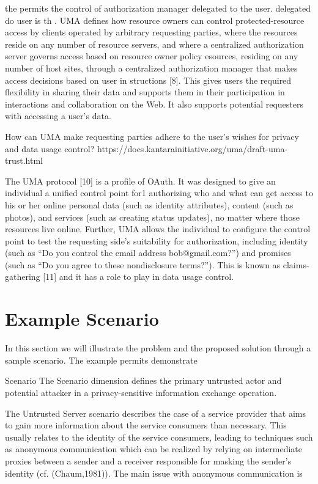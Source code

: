   the   permits the control of authorization manager delegated to the user.  delegated do user is th
  . UMA defines how resource owners can control protected-resource access by clients operated by arbitrary requesting parties, where the resources reside on any number of resource servers, and where a centralized authorization server governs access based on resource owner policy 
  esources,  residing  on  any  number  of  host  sites,  
  through  a  centralized  authorization  manager  that  makes  
  access decisions based on user in
  structions [8]. This gives 
  users  the  required  flexibility  in  sharing  their  data  and  
  supports  them  in  their  participation  in  interactions  and  
  collaboration   on   the   Web.   It   also   supports   potential   
  requesters with accessing a user’s data.
  
  How can UMA make requesting parties adhere to the user's wishes for privacy and data usage control?
  https://docs.kantarainitiative.org/uma/draft-uma-trust.html
  
  The UMA protocol [10] is a profile of OAuth. It was designed to give an individual a unified control point for1 authorizing who and what can get access to his or her online personal data (such as identity attributes), content (such as photos), and services (such as creating status updates), no matter where those resources live online. Further, UMA allows the individual to configure the control point to test the requesting side's suitability for authorization, including identity (such as “Do you control the email address bob@gmail.com?”) and promises (such as “Do you agree to these nondisclosure terms?”). This is known as claims-gathering [11] and it has a role to play in data usage control.



\section{Example Scenario}

In this section we will illustrate the problem and the proposed solution through a sample scenario. The example permits demonstrate 

Scenario The Scenario dimension defines the primary untrusted actor and potential attacker in a privacy-sensitive information exchange operation.

The Untrusted Server scenario describes the case of a service provider that aims to gain more information about the service
consumers than necessary. This usually relates to the identity of the service consumers, leading to techniques such as
anonymous communication which can be realized by relying on intermediate proxies between a sender and a receiver
responsible for masking the sender's identity (cf. (Chaum,1981)). The main issue with anonymous communication is

